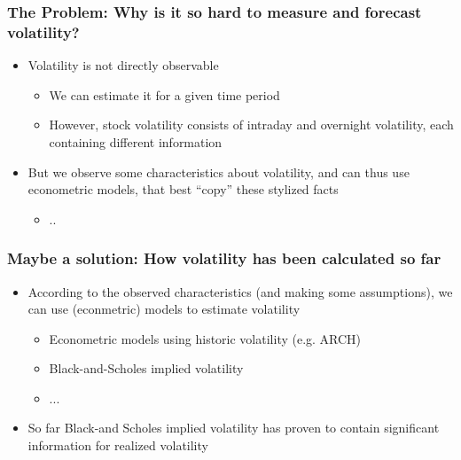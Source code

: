 \documentclass[aspectratio=169]{beamer}
\begin{document}
\begin{frame}
\frametitle{The Problem: Why is it so hard to measure and forecast volatility?}
	\begin{itemize}
	\item Volatility is not directly observable
	\begin{itemize}
	\item We can estimate it for a given time period 
	\item However, stock volatility consists of intraday and overnight volatility, each containing different information
	\end{itemize}
	\item But we observe some characteristics about volatility, and can thus use econometric models, that best ``copy'' these stylized facts
	\begin{itemize}
	\item ..
	\end{itemize}
	\end{itemize}
\end{frame}

\begin{frame}
\frametitle{Maybe a solution: How volatility has been calculated so far}
	\begin{itemize}
	\item According to the observed characteristics (and making some assumptions), we can use (econmetric) models to estimate volatility
	\begin{itemize}
	\item Econometric models using historic volatility (e.g. ARCH)
	\item Black-and-Scholes implied volatility
	\item ...
	\end{itemize}
	\item So far Black-and Scholes implied volatility has proven to contain significant information for realized volatility
	\end{itemize}
\end{frame}
\end{document}
